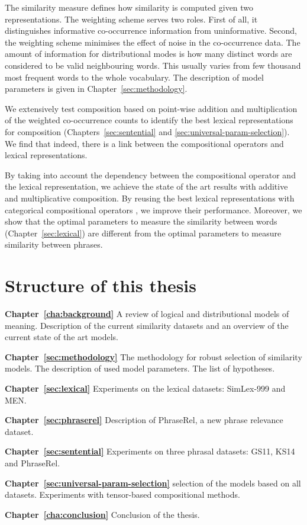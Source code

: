 The similarity measure defines how similarity is computed given two representations. The weighting scheme serves two roles. First of all, it distinguishes informative co-occurrence information from uninformative. Second, the weighting scheme minimises the effect of noise in the co-occurrence data. The amount of information for distributional modes is how many distinct words are considered to be valid neighbouring words. This usually varies from few thousand most frequent words to the whole vocabulary.  The description of model parameters is given in Chapter~\ref{sec:methodology}.

We extensively test composition based on point-wise addition and multiplication of the weighted co-occurrence counts to identify the best lexical representations for composition (Chapters~\ref{sec:sentential} and \ref{sec:universal-param-selection}). We find that indeed, there is a link between the compositional operators and lexical representations.

By taking into account the dependency between the compositional operator and the lexical representation,  we achieve the state of the art results with additive and multiplicative composition. By reusing the best lexical representations with categorical compositional operators \cite{DBLP:journals/corr/abs-1003-4394}, we improve their performance. Moreover, we show that the optimal parameters to measure the similarity between words (Chapter~\ref{sec:lexical}) are different from the optimal parameters to measure similarity between phrases.

\section{Structure of this thesis}
\label{sec:structure}

\textbf{Chapter~\ref{cha:background}} A review of logical and distributional models of meaning. Description of the current similarity datasets and an overview of the current state of the art models.

\textbf{Chapter~\ref{sec:methodology}} The methodology for robust selection of similarity models. The description of used model parameters. The list of hypotheses.

\textbf{Chapter~\ref{sec:lexical}} Experiments on the lexical datasets: SimLex-999 and MEN.

\textbf{Chapter~\ref{sec:phraserel}} Description of PhraseRel, a new phrase relevance dataset.

\textbf{Chapter~\ref{sec:sentential}} Experiments on three phrasal datasets: GS11, KS14 and PhraseRel.

\textbf{Chapter~\ref{sec:universal-param-selection}} selection of the models based on all datasets. Experiments with tensor-based compositional methods.

\textbf{Chapter~\ref{cha:conclusion}} Conclusion of the thesis.

